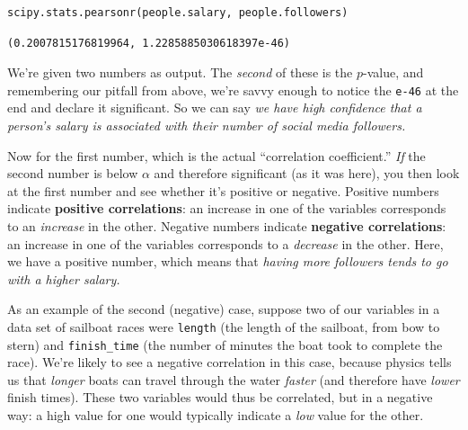 \begin{Verbatim}[fontsize=\small,samepage=true,frame=single,framesep=3mm]
scipy.stats.pearsonr(people.salary, people.followers)
\end{Verbatim}
\vspace{-.2in}

\begin{Verbatim}[fontsize=\small,samepage=true,frame=leftline,framesep=5mm,framerule=1mm]
(0.2007815176819964, 1.2285885030618397e-46)
\end{Verbatim}

We're given two numbers as output. The \textit{second} of these is the
$p$-value, and remembering our pitfall from above, we're savvy enough to notice
the \texttt{e-46} at the end and declare it significant. So we can say
\textit{we have high confidence that a person's salary is associated with their
number of social media followers.}


Now for the first number, which is the actual ``correlation coefficient.''
\textit{If} the second number is below $\alpha$ and therefore significant (as
it was here), you then look at the first number and see whether it's positive
or negative. Positive numbers indicate \textbf{positive correlations}: an
increase in one of the variables corresponds to an \textit{increase} in the
other. Negative numbers indicate \textbf{negative correlations}: an increase in
one of the variables corresponds to a \textit{decrease} in the other. Here, we
have a positive number, which means that \textit{having more followers tends to
go with a higher salary.}

As an example of the second (negative) case, suppose two of our variables in a
data set of sailboat races were \texttt{length} (the length of the sailboat,
from bow to stern) and \texttt{finish\_time} (the number of minutes the boat
took to complete the race). We're likely to see a negative correlation in this
case, because physics tells us that \textit{longer} boats can travel through
the water \textit{faster} (and therefore have \textit{lower} finish times).
These two variables would thus be correlated, but in a negative way: a high
value for one would typically indicate a \textit{low} value for the other.

